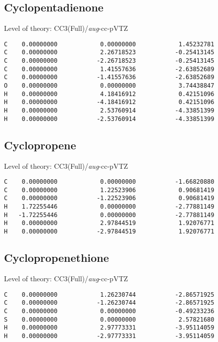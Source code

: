 \documentclass[journal=jctcce,manuscript=article,layout=traditional]{achemso}
\newcommand{\AVTZ}{\emph{aug}-cc-pVTZ}
\begin{document}
\subsection*{Cyclopentadienone}

\begin{singlespace}
Level of theory: CC3(Full)/{\AVTZ}
\begin{verbatim}
C    0.00000000            0.00000000            1.45232781
C    0.00000000            2.26718523           -0.25413145
C    0.00000000           -2.26718523           -0.25413145
C    0.00000000            1.41557636           -2.63852689
C    0.00000000           -1.41557636           -2.63852689
O    0.00000000            0.00000000            3.74438847
H    0.00000000            4.18416912            0.42151096
H    0.00000000           -4.18416912            0.42151096
H    0.00000000            2.53760914           -4.33851399
H    0.00000000           -2.53760914           -4.33851399
\end{verbatim}
\end{singlespace}

\subsection*{Cyclopropene}

\begin{singlespace}
Level of theory: CC3(Full)/{\AVTZ}
\begin{verbatim}
C    0.00000000            0.00000000           -1.66820880
C    0.00000000            1.22523906            0.90681419
C    0.00000000           -1.22523906            0.90681419
H    1.72255446            0.00000000           -2.77881149
H   -1.72255446            0.00000000           -2.77881149
H    0.00000000            2.97844519            1.92076771
H    0.00000000           -2.97844519            1.92076771
\end{verbatim}
\end{singlespace}

\subsection*{Cyclopropenethione}

\begin{singlespace}
Level of theory: CC3(Full)/{\AVTZ}
\begin{verbatim}
C    0.00000000            1.26230744           -2.86571925
C    0.00000000           -1.26230744           -2.86571925
C    0.00000000            0.00000000           -0.49233236
S    0.00000000            0.00000000            2.57821680
H    0.00000000            2.97773331           -3.95114059
H    0.00000000           -2.97773331           -3.95114059
\end{verbatim}
\end{singlespace}
\end{document}

